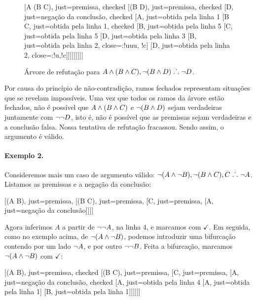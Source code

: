 \begin{figure}[h!]
\begin{center}
\begin{tableau}
	{
	}
	[A \eand (B \eand C), just={premissa}, checked
	[\enot(B \eand D), just={premissa}, checked
	[\enot \enot D, just={negação da conclusão}, checked
	[A, just={obtida pela linha 1}
	[B \eand C, just={obtida pela linha 1}, checked
	[B, just={obtida pela linha 5}
	[C, just={obtida pela linha 5}
	[D, just={obtida pela linha 3}
		[\enot B, just={obtida pela linha 2}, close={:!uuu, !c}]
		[\enot D, just={obtida pela linha 2}, close={:!u,!c}]]]]]]]]]
\end{tableau}
\end{center}
	\caption{Árvore de refutação para $A \wedge (B \wedge C), \neg(B \wedge D) \mathrel{\ldotp\dot{}\,\ldotp} \neg D$.}
	\label{truth.trees.ex.1}
\end{figure}

Por causa do princípio de não-contradição, ramos fechados representam situações que se revelam impossíveis.
Uma vez que todos os ramos da árvore estão fechados, não é possível que $A \wedge (B \wedge C)$ e $\neg(B \wedge D)$ sejam verdadeiras juntamente com $\neg \neg D$, isto é, não é possível que as premissas sejam verdadeiras e a conclusão falsa.
Nossa tentativa de refutação fracassou.
Sendo assim, o argumento é válido.

\paragraph{Exemplo 2.}
Consideremos mais um caso de argumento válido: $\neg(A \wedge \neg B), \neg(B \wedge C), C \mathrel{\ldotp\dot{}\,\ldotp} \neg A$.
Listamos as premissas e a negação da conclusão:

\begin{center}
	\begin{tableau}
		{
		}
		[\enot(A \eand \enot B), just=premissa, 
		[\enot(B \eand C), just=premissa, 
		[C, just=premissa, 
		[\enot \enot A, just={negação da conclusão}]]]]
	\end{tableau}
\end{center}

Agora inferimos $A$ a partir de $\neg \neg A$, na linha 4, e marcamos com $\checkmark$. 
Em seguida, como no exemplo acima, de $\neg(A \wedge \neg B)$, podemos introduzir uma bifurcação contendo por um lado $\neg A$, e por outro  $\neg \neg B$.
Feita a bifurcação, marcamos $\neg(A \wedge \neg B)$ com $\checkmark$:

\begin{center}
	\begin{tableau}
		{
		}
		[\enot(A \eand \enot B), just=premissa, checked
		[\enot(B \eand C), just=premissa, 
		[C, just=premissa, 
		[\enot \enot A, just={negação da conclusão}, checked
		[A, just={obtida pela linha 4}
			[\enot A, just={obtida pela linha 1}]
			[\enot \enot B, just={obtida pela linha 1}]]]]]]
	\end{tableau}
\end{center}


